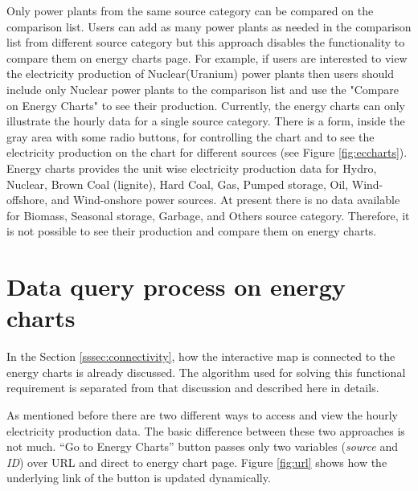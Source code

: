 Only power plants from the same source category can be compared on the comparison list. Users can add as many power plants as needed in the comparison list from different source category but this approach disables the functionality to compare them on energy charts page. For example, if users are interested to view the electricity production of Nuclear(Uranium) power plants then users should include only Nuclear power plants to the comparison list and use the "Compare on Energy Charts" to see their production. Currently, the energy charts can only illustrate the hourly data for a single source category. There is a form, inside the gray area with some radio buttons, for controlling the chart and to see the electricity production on the chart for different sources (see Figure \ref{fig:eccharts}). Energy charts provides the unit wise electricity production data for Hydro, Nuclear, Brown Coal (lignite), Hard Coal, Gas, Pumped storage, Oil, Wind-offshore, and Wind-onshore power sources. At present there is no data available for Biomass, Seasonal storage, Garbage, and Others source category. Therefore, it is not possible to see their production and compare them on energy charts.   

\section{Data query process on energy charts}
\label{sec:algorithm}

In the Section \ref{sssec:connectivity}, how the interactive map is connected to the energy charts is already discussed. The algorithm used for solving this functional requirement is separated from that discussion and described here in details. 

As mentioned before there are two different ways to access and view the hourly electricity production data. The basic difference between these two approaches is not much. “Go to Energy Charts” button passes only two variables (\textit{source} and \textit{ID}) over URL and direct to energy chart page. Figure \ref{fig:url} shows how the underlying link of the button is updated dynamically. 

